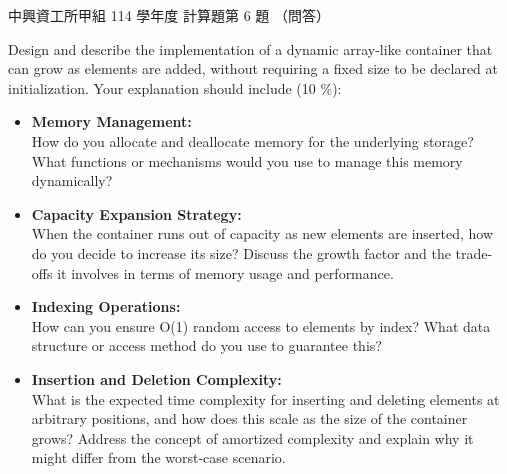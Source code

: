 \begin{pastexam}[label={px:nchu-114-dsa-26}]{中興資工所甲組 114 學年度 計算題第 6 題}
（問答）

Design and describe the implementation of a dynamic array-like container that can grow as elements are added, without requiring a fixed size to be declared at initialization. Your explanation should include (10 \%):
\begin{itemize}
\item \textbf{Memory Management:}\\
How do you allocate and deallocate memory for the underlying storage? What functions or mechanisms would you use to manage this memory dynamically?
\item \textbf{Capacity Expansion Strategy:}\\
When the container runs out of capacity as new elements are inserted, how do you decide to increase its size? Discuss the growth factor and the trade-offs it involves in terms of memory usage and performance.
\item \textbf{Indexing Operations:}\\
How can you ensure O(1) random access to elements by index? What data structure or access method do you use to guarantee this?
\item \textbf{Insertion and Deletion Complexity:}\\
What is the expected time complexity for inserting and deleting elements at arbitrary positions, and how does this scale as the size of the container grows? Address the concept of amortized complexity and explain why it might differ from the worst-case scenario.
\end{itemize}
\end{pastexam}

